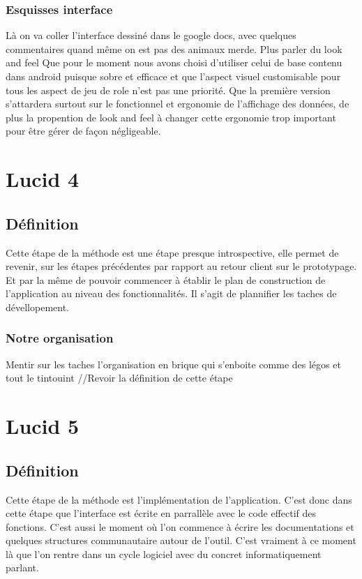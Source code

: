 \documentclass[11pt,a4paper]{article}
\begin{document}
\subsubsection{Esquisses interface}

Là on va coller l'interface dessiné dans le google docs, avec quelques
commentaires quand même on est pas des animaux merde.
Plus parler du look and feel
Que pour le moment nous avons choisi d'utiliser celui de base contenu dans
android puisque sobre et efficace et que l'aspect visuel customisable pour tous
les aspect de jeu de role n'est pas une priorité. Que la première version
s'attardera surtout sur le fonctionnel et ergonomie de l'affichage des données,
de plus la propention de look and feel à changer cette ergonomie trop important
pour être gérer de façon négligeable.

\section{Lucid 4}

\subsection{Définition}

Cette étape de la méthode est une étape presque introspective, elle permet de
revenir, sur les étapes précédentes par rapport au retour client sur le
prototypage. Et par la même de pouvoir commencer à établir le plan de
construction de l'application au niveau des fonctionnalités. Il s'agit de
plannifier les taches de dévellopement. 

\subsubsection{Notre organisation}

Mentir sur les taches l'organisation en brique qui s'enboite comme des légos et
tout le tintouint
//Revoir la définition de cette étape


\clearpage

\section{Lucid 5}

\subsection{Définition}

Cette étape de la méthode est l'implémentation de l'application. C'est donc dans
cette étape que l'interface est écrite en parrallèle avec le code effectif des
fonctions. C'est aussi le moment où l'on commence à écrire les documentations et
quelques structures communautaire autour de l'outil. C'est vraiment à ce moment
là que l'on rentre dans un cycle logiciel avec du concret informatiquement
parlant.
\end{document}
